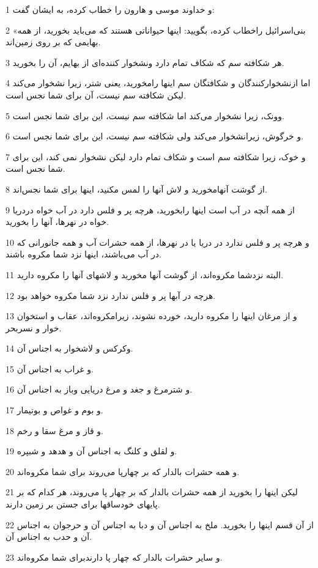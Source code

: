 \par 1 و خداوند موسی و هارون را خطاب کرده، به ایشان گفت:
\par 2 «بنی‌اسرائیل راخطاب کرده، بگویید: اینها حیواناتی هستند که می‌باید بخورید، از همه بهایمی که بر روی زمین‌اند.
\par 3 هر شکافته سم که شکاف تمام دارد ونشخوار کننده‌ای از بهایم، آن را بخورید.
\par 4 اما ازنشخوارکنندگان و شکافتگان سم اینها رامخورید، یعنی شتر، زیرا نشخوار می‌کند لیکن شکافته سم نیست، آن برای شما نجس است.
\par 5 وونک، زیرا نشخوار می‌کند اما شکافته سم نیست، این برای شما نجس است.
\par 6 و خرگوش، زیرانشخوار می‌کند ولی شکافته سم نیست، این برای شما نجس است.
\par 7 و خوک، زیرا شکافته سم است و شکاف تمام دارد لیکن نشخوار نمی کند، این برای شما نجس است.
\par 8 از گوشت آنهامخورید و لاش آنها را لمس مکنید، اینها برای شما نجس‌اند.
\par 9 از همه آنچه در آب است اینها رابخورید، هر‌چه پر و فلس دارد در آب خواه دردریا خواه در نهرها، آنها را بخورید.
\par 10 و هر‌چه پر و فلس ندارد در دریا یا در نهرها، از همه حشرات آب و همه جانورانی که در آب می‌باشند، اینها نزد شما مکروه باشند.
\par 11 البته نزدشما مکروه‌اند، از گوشت آنها مخورید و لاشهای آنها را مکروه دارید.
\par 12 هر‌چه در آبها پر و فلس ندارد نزد شما مکروه خواهد بود.
\par 13 و از مرغان اینها را مکروه دارید، خورده نشوند، زیرامکروه‌اند، عقاب و استخوان خوار و نسربحر.
\par 14 وکرکس و لاشخوار به اجناس آن.
\par 15 و غراب به اجناس آن.
\par 16 و شترمرغ و جغد و مرغ دریایی وباز به اجناس آن.
\par 17 و بوم و غواص و بوتیمار.
\par 18 و قاز و مرغ سقا و رخم.
\par 19 و لقلق و کلنگ به اجناس آن و هدهد و شبپره.
\par 20 و همه حشرات بالدار که بر چهارپا می‌روند برای شما مکروه‌اند.
\par 21 لیکن اینها را بخورید از همه حشرات بالدار که بر چهار پا می‌روند، هر کدام که بر پایهای خودساقها برای جستن بر زمین دارند.
\par 22 از آن قسم اینها را بخورید. ملخ به اجناس آن و دبا به اجناس آن و حرجوان به اجناس آن و حدب به اجناس آن.
\par 23 و سایر حشرات بالدار که چهار پا دارندبرای شما مکروه‌اند.

